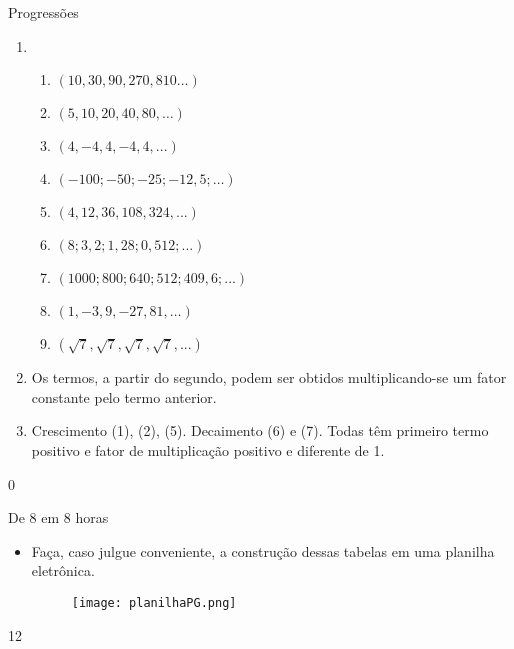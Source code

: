 \begin{answer}{Progressões}
{
\begin{enumerate}

\item 
\begin{enumerate}
\item $(10, 30, 90, 270, 810…)$

\item  $(5, 10, 20, 40, 80, …)$

\item  $(4, -4, 4, -4, 4,...)$

\item  $(-100; -50; -25; -12,5; …)$

\item  $(4,12,36,108, 324,...)$

\item  $(8; 3,2; 1,28; 0,512;...)$

\item  $(1000; 800; 640; 512; 409,6;...)$

\item  $(1, -3, 9, -27, 81, …)$

\item  $(\sqrt 7, \sqrt 7, \sqrt 7, \sqrt 7,...)$
\end{enumerate}

\item Os termos, a partir do segundo, podem ser obtidos multiplicando-se um fator constante pelo termo anterior.

\item Crescimento (1), (2), (5). Decaimento (6) e (7). Todas têm primeiro termo positivo e fator de multiplicação positivo e diferente de 1.


\end{enumerate}
}{0}
\end{answer}
\clearmargin
\begin{sugestions}{De 8 em 8 horas}
{
\begin{itemize}
\item Faça, caso julgue conveniente, a construção dessas tabelas em uma planilha eletrônica.

\begin{figure}[H]
\centering
\noindent\texttt{[image: planilhaPG.png]}
\end{figure}
\end{itemize}
}{1}{2}
\end{sugestions}
